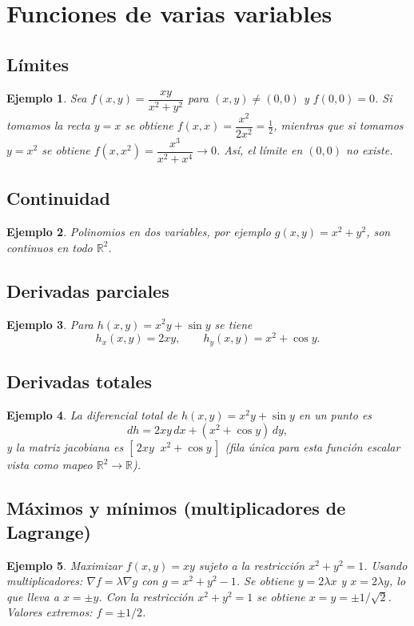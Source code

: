 \documentclass[12pt]{article}
\newtheorem{example}{Ejemplo}[section]
\begin{document}
\section{Funciones de varias variables}
\subsection{Límites}
\begin{example}
Sea $f(x,y)=\dfrac{xy}{x^2+y^2}$ para $(x,y)\neq(0,0)$ y $f(0,0)=0$. Si tomamos la recta $y=x$ se obtiene $f(x,x)=\dfrac{x^2}{2x^2}=\tfrac12$, mientras que si tomamos $y=x^2$ se obtiene $f(x,x^2)=\dfrac{x^3}{x^2+x^4}\to0$. Así, el límite en $(0,0)$ no existe.
\end{example}

\subsection{Continuidad}
\begin{example}
Polinomios en dos variables, por ejemplo $g(x,y)=x^2+y^2$, son continuos en todo $\mathbb{R}^2$.
\end{example}

\subsection{Derivadas parciales}
\begin{example}
Para $h(x,y)=x^2y+\sin y$ se tiene
$$h_x(x,y)=2xy,\qquad h_y(x,y)=x^2+\cos y.$$ 
\end{example}

\subsection{Derivadas totales}
\begin{example}
La diferencial total de $h(x,y)=x^2y+\sin y$ en un punto es
$$dh=2xy\,dx+(x^2+\cos y)\,dy,$$
y la matriz jacobiana es $[\,2xy\;\; x^2+\cos y\,]$ (fila única para esta función escalar vista como mapeo $\mathbb{R}^2\to\mathbb{R}$).
\end{example}

\subsection{Máximos y mínimos (multiplicadores de Lagrange)}
\begin{example}
Maximizar $f(x,y)=xy$ sujeto a la restricción $x^2+y^2=1$. 
Usando multiplicadores: $\nabla f=\lambda\nabla g$ con $g=x^2+y^2-1$. Se obtiene $y=2\lambda x$ y $x=2\lambda y$, lo que lleva a $x=\pm y$. Con la restricción $x^2+y^2=1$ se obtiene $x=y=\pm1/\sqrt2$. Valores extremos: $f=\pm1/2$.
\end{example}
\end{document}
